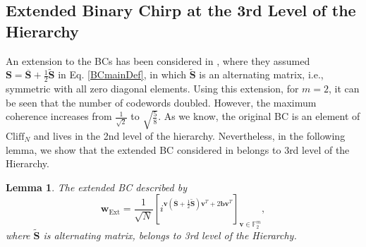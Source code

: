 \documentclass[lettersize,journal,onecolumn]{IEEEtran}
\newtheorem{lemma}{Lemma}
\begin{document}
\subsection{Extended Binary Chirp at the 3rd Level of the Hierarchy}
An extension to the BCs has been considered in \cite{PitvalExtendedChirp21}, where they assumed  $\mathbf{S}=\overline{\mathbf{S}}+\frac{1}{2}\widetilde{\mathbf{S}}$ in Eq. \eqref{BCmainDef}, in which $\widetilde{\mathbf{S}}$ is an alternating matrix, i.e., symmetric with all zero diagonal elements. Using this extension, for $m=2$, it can be seen that the number of codewords doubled. However, the maximum coherence increases from $\frac{1}{\sqrt{2}}$ to $\sqrt{\frac{5}{8}}$. As we know, the original BC is an element of $\text{Cliff}_N$ and lives in the 2nd level of the hierarchy. Nevertheless, in the following lemma, we show that the extended BC considered in \cite{PitvalExtendedChirp21} belongs to 3rd level of the Hierarchy.
\begin{lemma}\label{lemaPitavalLevel}
	The extended BC described by
	\begin{equation}\label{BCExt1Def}
		\mathbf{w}_{\text{Ext}} = \dfrac{1}{\sqrt{N}}\left[i^{\mathbf{v}\left( \overline{\mathbf{S}}+\frac{1}{2}\widetilde{\mathbf{S}} \right)\mathbf{v}^T + 2\mathbf{b}\mathbf{v}^T } \right]_{\mathbf{v} \in \mathbb{F}_2^m},
	\end{equation}
where $\widetilde{\mathbf{S}}$ is alternating matrix, belongs to 3rd level of the Hierarchy.
\end{lemma}
\end{document}
